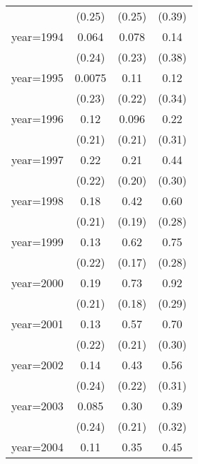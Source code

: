 \begin{sidewaystable}[htbp]
\begin{tabular}{l*{3}{c}}
                &   (0.25)         &   (0.25)         &   (0.39)         \\
\addlinespace
year=1994       &    0.064         &    0.078         &     0.14         \\
                &   (0.24)         &   (0.23)         &   (0.38)         \\
\addlinespace
year=1995       &   0.0075         &     0.11         &     0.12         \\
                &   (0.23)         &   (0.22)         &   (0.34)         \\
\addlinespace
year=1996       &     0.12         &    0.096         &     0.22         \\
                &   (0.21)         &   (0.21)         &   (0.31)         \\
\addlinespace
year=1997       &     0.22         &     0.21         &     0.44         \\
                &   (0.22)         &   (0.20)         &   (0.30)         \\
\addlinespace
year=1998       &     0.18         &     0.42\sym{**} &     0.60\sym{**} \\
                &   (0.21)         &   (0.19)         &   (0.28)         \\
\addlinespace
year=1999       &     0.13         &     0.62\sym{***}&     0.75\sym{***}\\
                &   (0.22)         &   (0.17)         &   (0.28)         \\
\addlinespace
year=2000       &     0.19         &     0.73\sym{***}&     0.92\sym{***}\\
                &   (0.21)         &   (0.18)         &   (0.29)         \\
\addlinespace
year=2001       &     0.13         &     0.57\sym{***}&     0.70\sym{**} \\
                &   (0.22)         &   (0.21)         &   (0.30)         \\
\addlinespace
year=2002       &     0.14         &     0.43\sym{*}  &     0.56\sym{*}  \\
                &   (0.24)         &   (0.22)         &   (0.31)         \\
\addlinespace
year=2003       &    0.085         &     0.30         &     0.39         \\
                &   (0.24)         &   (0.21)         &   (0.32)         \\
\addlinespace
year=2004       &     0.11         &     0.35\sym{*}  &     0.45         \\

\end{tabular}
\end{sidewaystable}

